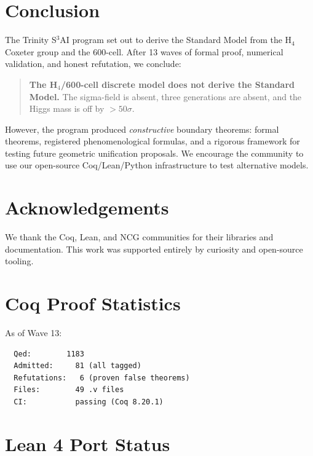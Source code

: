 \documentclass[11pt,a4paper]{article}
\theoremstyle{definition}
\begin{document}
\section{Conclusion}\label{sec:conclusion}

The Trinity S$^3$AI program set out to derive the Standard Model from the
H$_4$ Coxeter group and the 600-cell. After 13 waves of formal proof,
numerical validation, and honest refutation, we conclude:

\begin{quote}
  \textbf{The H$_4$/600-cell discrete model does not derive the Standard
  Model.} The sigma-field is absent, three generations are absent, and the
  Higgs mass is off by $> 50\sigma$.
\end{quote}

However, the program produced \emph{constructive} boundary theorems:
formal theorems, registered phenomenological formulas, and a rigorous framework for
testing future geometric unification proposals. We encourage the community
to use our open-source Coq/Lean/Python infrastructure to test alternative
models.

\section*{Acknowledgements}

We thank the Coq, Lean, and NCG communities for their libraries and
documentation. This work was supported entirely by curiosity and
open-source tooling.

\appendix

\section{Coq Proof Statistics}\label{app:coq}

As of Wave 13:
\begin{verbatim}
  Qed:        1183
  Admitted:     81 (all tagged)
  Refutations:   6 (proven false theorems)
  Files:        49 .v files
  CI:           passing (Coq 8.20.1)
\end{verbatim}

\section{Lean 4 Port Status}\label{app:lean}
\end{document}
